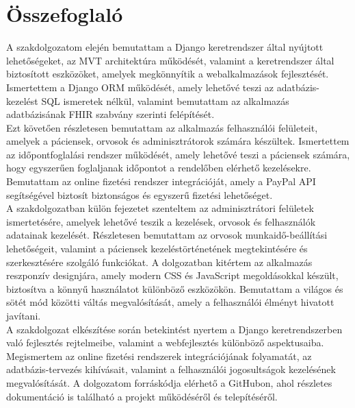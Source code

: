 \chapter{Összefoglaló}
\label{chap:conclusion}

A szakdolgozatom elején bemutattam a Django keretrendszer által nyújtott lehetőségeket, az MVT architektúra működését, valamint a keretrendszer által biztosított eszközöket, amelyek megkönnyítik a webalkalmazások fejlesztését. Ismertettem a Django ORM működését, amely lehetővé teszi az adatbázis-kezelést SQL ismeretek nélkül, valamint bemutattam az alkalmazás adatbázisának FHIR szabvány szerinti felépítését.\\
Ezt követően részletesen bemutattam az alkalmazás felhasználói felületeit, amelyek a páciensek, orvosok és adminisztrátorok számára készültek. Ismertettem az időpontfoglalási rendszer működését, amely lehetővé teszi a páciensek számára, hogy egyszerűen foglaljanak időpontot a rendelőben elérhető kezelésekre. Bemutattam az online fizetési rendszer integrációját, amely a PayPal API segítségével biztosít biztonságos és egyszerű fizetési lehetőséget.\\
A szakdolgozatban külön fejezetet szenteltem az adminisztrátori felületek ismertetésére, amelyek lehetővé teszik a kezelések, orvosok és felhasználók adatainak kezelését. Részletesen bemutattam az orvosok munkaidő-beállítási lehetőségeit, valamint a páciensek kezeléstörténetének megtekintésére és szerkesztésére szolgáló funkciókat.
A dolgozatban kitértem az alkalmazás reszponzív designjára, amely modern CSS és JavaScript megoldásokkal készült, biztosítva a könnyű használatot különböző eszközökön. Bemutattam a világos és sötét mód közötti váltás megvalósítását, amely a felhasználói élményt hivatott javítani.\\
A szakdolgozat elkészítése során betekintést nyertem a Django keretrendszerben való fejlesztés rejtelmeibe, valamint a webfejlesztés különböző aspektusaiba. Megismertem az online fizetési rendszerek integrációjának folyamatát, az adatbázis-tervezés kihívásait, valamint a felhasználói jogosultságok kezelésének megvalósítását. A dolgozatom forráskódja elérhető a GitHubon, ahol részletes dokumentáció is található a projekt működéséről és telepítéséről.
